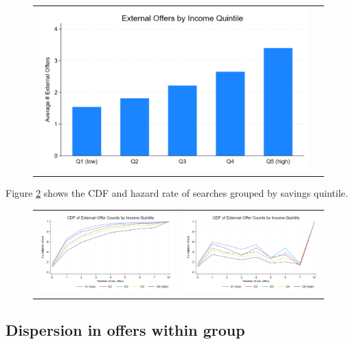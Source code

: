 \documentclass[12pt]{article}
\begin{document}
\begin{figure}[H]
\caption{}
 \label{fig:ie2_3}
\centering{}%
\begin{tabular}{cc}
\includegraphics[scale=0.27]{figures/IE2_search_by_income_quintile.png}
\end{tabular}
\end{figure}

Figure \ref{fig:ie2_4} shows the CDF and hazard rate of searches grouped by savings quintile. 

\begin{figure}[H] 
\caption{}
\label{fig:ie2_4}
\centering{}%
\begin{tabular}{cc}
\includegraphics[scale=0.26]{figures/IE2_search_CDF_by_income_quintile.png} & \includegraphics[scale=0.26]{figures/IE2_search_hazardrate_by_income_quintile.png}
\end{tabular}
\end{figure}

\subsection{Dispersion in offers within group}
\end{document}
